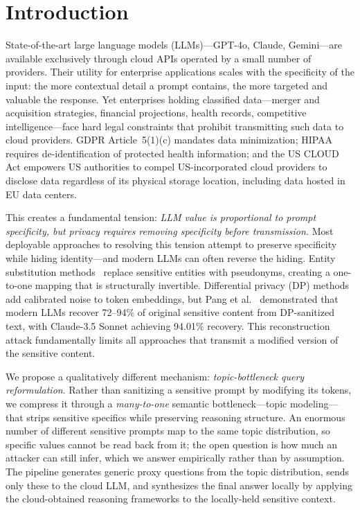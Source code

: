 \documentclass[sigconf,balance=false]{acmart}
\begin{document}
\section{Introduction}
\label{sec:intro}

State-of-the-art large language models (LLMs)---GPT-4o, Claude, Gemini---are available exclusively through cloud APIs operated by a small number of providers.
Their utility for enterprise applications scales with the specificity of the input: the more contextual detail a prompt contains, the more targeted and valuable the response.
Yet enterprises holding classified data---merger and acquisition strategies, financial projections, health records, competitive intelligence---face hard legal constraints that prohibit transmitting such data to cloud providers.
GDPR Article~5(1)(c) mandates data minimization; HIPAA requires de-identification of protected health information; and the US CLOUD Act empowers US authorities to compel US-incorporated cloud providers to disclose data regardless of its physical storage location, including data hosted in EU data centers.

This creates a fundamental tension: \emph{LLM value is proportional to prompt specificity, but privacy requires removing specificity before transmission.}
Most deployable approaches to resolving this tension attempt to preserve specificity while hiding identity---and modern LLMs can often reverse the hiding.
Entity substitution methods~\cite{chen2023, albanese2026, agyemang2026, yang2025} replace sensitive entities with pseudonyms, creating a one-to-one mapping that is structurally invertible.
Differential privacy (DP) methods~\cite{yue2021, chen2023custext, tem2021, cape2025, inferdpt2023, dyntext2025, clusant2025} add calibrated noise to token embeddings, but Pang et al.~\cite{pang2024} demonstrated that modern LLMs recover 72--94\% of original sensitive content from DP-sanitized text, with Claude-3.5 Sonnet achieving 94.01\% recovery.
This reconstruction attack fundamentally limits all approaches that transmit a modified version of the sensitive content.

We propose a qualitatively different mechanism: \emph{topic-bottleneck query reformulation}.
Rather than sanitizing a sensitive prompt by modifying its tokens, we compress it through a \emph{many-to-one} semantic bottleneck---topic modeling---that strips sensitive specifics while preserving reasoning structure.
An enormous number of different sensitive prompts map to the same topic distribution, so specific values cannot be read back from it; the open question is how much an attacker can still infer, which we answer empirically rather than by assumption.
The pipeline generates generic proxy questions from the topic distribution, sends only these to the cloud LLM, and synthesizes the final answer locally by applying the cloud-obtained reasoning frameworks to the locally-held sensitive context.
\end{document}
